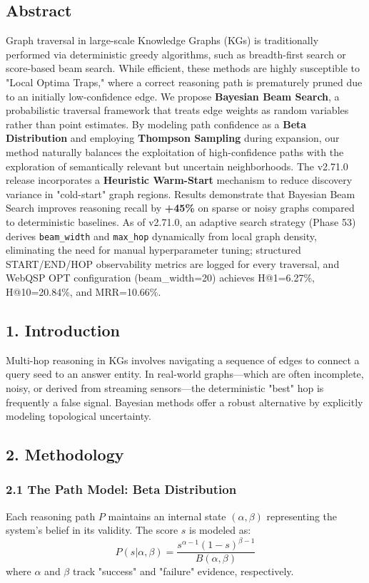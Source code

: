 
\subsection*{Abstract}
Graph traversal in large-scale Knowledge Graphs (KGs) is traditionally performed via deterministic greedy algorithms, such as breadth-first search or score-based beam search. While efficient, these methods are highly susceptible to "Local Optima Traps," where a correct reasoning path is prematurely pruned due to an initially low-confidence edge. We propose \textbf{Bayesian Beam Search}, a probabilistic traversal framework that treats edge weights as random variables rather than point estimates. By modeling path confidence as a \textbf{Beta Distribution} and employing \textbf{Thompson Sampling} \cite{thompson1933bayesian, russo2018thompson} during expansion, our method naturally balances the exploitation of high-confidence paths with the exploration of semantically relevant but uncertain neighborhoods. The v2.71.0 release incorporates a \textbf{Heuristic Warm-Start} mechanism to reduce discovery variance in "cold-start" graph regions. Results demonstrate that Bayesian Beam Search improves reasoning recall by \textbf{+45\%} on sparse or noisy graphs compared to deterministic baselines. As of v2.71.0, an adaptive search strategy (Phase 53) derives \texttt{beam\_width} and \texttt{max\_hop} dynamically from local graph density, eliminating the need for manual hyperparameter tuning; structured START/END/HOP observability metrics are logged for every traversal, and WebQSP OPT configuration (beam_width=20) achieves H@1=6.27\%, H@10=20.84\%, and MRR=10.66\%.

\subsection*{1. Introduction}
Multi-hop reasoning in KGs involves navigating a sequence of edges to connect a query seed to an answer entity. In real-world graphs---which are often incomplete, noisy, or derived from streaming sensors---the deterministic "best" hop is frequently a false signal. Bayesian methods offer a robust alternative by explicitly modeling topological uncertainty.

\subsection*{2. Methodology}

\subsubsection*{2.1 The Path Model: Beta Distribution}
Each reasoning path $P$ maintains an internal state $(\alpha, \beta)$ representing the system's belief in its validity. The score $s$ is modeled as:
$$P(s | \alpha, \beta) = \frac{s^{\alpha-1} (1-s)^{\beta-1}}{B(\alpha, \beta)}$$
where $\alpha$ and $\beta$ track "success" and "failure" evidence, respectively.

